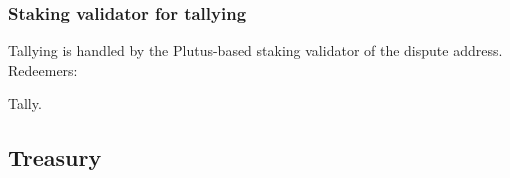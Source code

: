 \documentclass[../hydrozoa.tex]{subfiles}
\begin{document}
\subsubsection{Staking validator for tallying}

Tallying is handled by the Plutus-based staking validator of the dispute address.
Redeemers:
\begin{description}
  \item[Tally.]
\end{description}






\subsection{Treasury}%
\label{h:rule-based-treasury}





\end{document}

